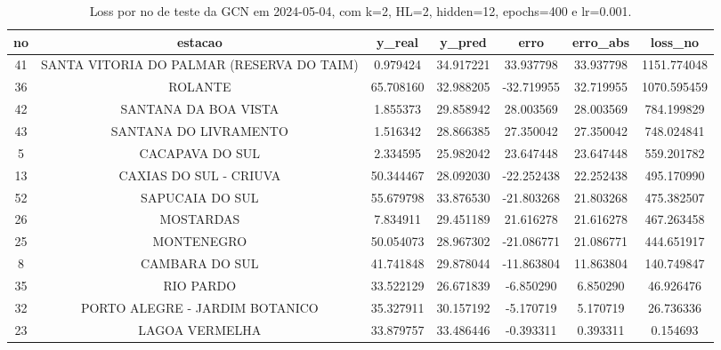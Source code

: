 \begin{table}[h]
\centering
\caption{Loss por no de teste da GCN em 2024-05-04, com k=2, HL=2, hidden=12, epochs=400 e lr=0.001.}
\label{tab:gcn_loss_k2_hl2_h12_e400_d20240504}
\begin{tabular}{ccccccc}
\toprule
no & estacao & y\_real & y\_pred & erro & erro\_abs & loss\_no \\
\midrule
41 & SANTA VITORIA DO PALMAR (RESERVA DO TAIM) & 0.979424 & 34.917221 & 33.937798 & 33.937798 & 1151.774048 \\
36 & ROLANTE & 65.708160 & 32.988205 & -32.719955 & 32.719955 & 1070.595459 \\
42 & SANTANA DA BOA VISTA & 1.855373 & 29.858942 & 28.003569 & 28.003569 & 784.199829 \\
43 & SANTANA DO LIVRAMENTO & 1.516342 & 28.866385 & 27.350042 & 27.350042 & 748.024841 \\
5 & CACAPAVA DO SUL & 2.334595 & 25.982042 & 23.647448 & 23.647448 & 559.201782 \\
13 & CAXIAS DO SUL - CRIUVA & 50.344467 & 28.092030 & -22.252438 & 22.252438 & 495.170990 \\
52 & SAPUCAIA DO SUL & 55.679798 & 33.876530 & -21.803268 & 21.803268 & 475.382507 \\
26 & MOSTARDAS & 7.834911 & 29.451189 & 21.616278 & 21.616278 & 467.263458 \\
25 & MONTENEGRO & 50.054073 & 28.967302 & -21.086771 & 21.086771 & 444.651917 \\
8 & CAMBARA DO SUL & 41.741848 & 29.878044 & -11.863804 & 11.863804 & 140.749847 \\
35 & RIO PARDO & 33.522129 & 26.671839 & -6.850290 & 6.850290 & 46.926476 \\
32 & PORTO ALEGRE - JARDIM BOTANICO & 35.327911 & 30.157192 & -5.170719 & 5.170719 & 26.736336 \\
23 & LAGOA VERMELHA & 33.879757 & 33.486446 & -0.393311 & 0.393311 & 0.154693 \\
\bottomrule
\end{tabular}
\end{table}

